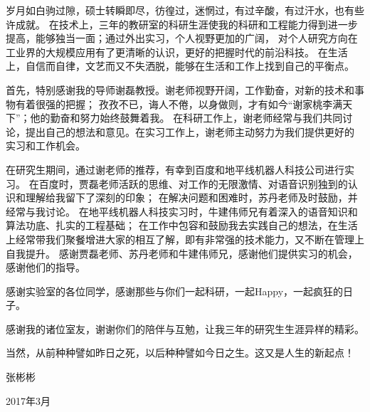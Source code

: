 

\vspace{2ex}
岁月如白驹过隙，硕士转瞬即尽，彷徨过，迷惘过，有过辛酸，有过汗水，也有些许成就。
在技术上，三年的教研室的科研生涯使我的科研和工程能力得到进一步提高，能够独当一面；通过外出实习，个人视野更加的广阔，
对个人研究方向在工业界的大规模应用有了更清晰的认识，更好的把握时代的前沿科技。
在生活上，自信而自律，文艺而又不失洒脱，能够在生活和工作上找到自己的平衡点。


首先，特别感谢我的导师谢磊教授。谢老师视野开阔，工作勤奋，对新的技术和事物有着很强的把握；
孜孜不已，诲人不倦，以身做则，才有如今“谢家桃李满天下”；他的勤奋和努力始终鼓舞着我。
在科研工作上，谢老师经常与我们共同讨论，提出自己的想法和意见。在实习工作上，谢老师主动努力为我们提供更好的
实习和工作机会。

在研究生期间，通过谢老师的推荐，有幸到百度和地平线机器人科技公司进行实习。
在百度时，贾磊老师活跃的思维、对工作的无限激情、对语音识别独到的认识和理解给我留下了深刻的印象；
在解决问题和困难时，苏丹老师及时鼓励，并经常与我讨论。
在地平线机器人科技实习时，牛建伟师兄有着深入的语音知识和算法功底、扎实的工程基础；
在工作中包容和鼓励我去实践自己的想法，在生活上经常带我们聚餐增进大家的相互了解，即有非常强的技术能力，又不断在管理上自我提升。
感谢贾磊老师、苏丹老师和牛建伟师兄，感谢他们提供实习的机会，感谢他们的指导。

感谢实验室的各位同学，感谢那些与你们一起科研，一起Happy，一起疯狂的日子。

感谢我的诸位室友，谢谢你们的陪伴与互勉，让我三年的研究生生涯异样的精彩。

当然，从前种种譬如昨日之死，以后种种譬如今日之生。这又是人生的新起点！

\vspace{24pt}

\quad\quad\quad\quad\quad\quad\quad\quad\quad\quad\quad\quad\quad\quad\quad\quad\quad\quad\quad\quad\quad\quad\quad\quad\quad\quad\quad\quad\quad\quad 张彬彬

\quad\quad\quad\quad\quad\quad\quad\quad\quad\quad\quad\quad\quad\quad\quad\quad\quad\quad\quad\quad\quad\quad\quad\quad\quad\quad\quad\quad\quad 2017年3月




\clearpage\mbox{}
